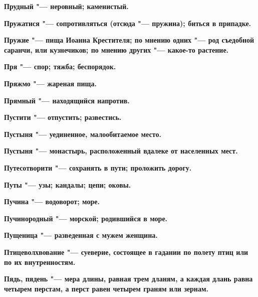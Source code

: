 \begin{multicols}{2}
\bfseries Прудный\normalfont{} "--- неровный; каменистый. 




\bfseries Пружатися\normalfont{} "--- сопротивляться (отсюда "--- пружина); биться в припадке. 




\bfseries Пружие\normalfont{} "--- пища Иоанна Крестителя; по мнению одних "--- род съедобной саранчи, или кузнечиков; по мнению других "--- какое-то растение. 




\bfseries Пря\normalfont{} "--- спор; тяжба; беспорядок. 




\bfseries Пряжмо\normalfont{} "--- жареная пища. 




\bfseries Прямный\normalfont{} "--- находящийся напротив. 




\bfseries Пустити\normalfont{} "--- отпустить; развестись. 




\bfseries Пустыня\normalfont{} "--- уединенное, малообитаемое место. 




\bfseries Пустыня\normalfont{} "--- монастырь, расположенный вдалеке от населенных мест. 




\bfseries Путесотворити\normalfont{} "--- сохранять в пути; проложить дорогу. 




\bfseries Путы\normalfont{} "--- узы; кандалы; цепи; оковы. 




\bfseries Пучина\normalfont{} "--- водоворот; море. 




\bfseries Пучинородный\normalfont{} "--- морской; родившийся в море. 




\bfseries Пущеница\normalfont{} "--- разведенная с мужем женщина. 




\bfseries Птицеволхвование\normalfont{} "--- суеверие, состоящее в гадании по полету птиц или по их внутренностям. 




\bfseries Пядь, пядень\normalfont{} "--- мера длины, равная трем дланям, а каждая длань равна четырем перстам, а перст равен четырем граням или зернам. 





\end{multicols}

